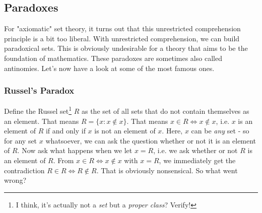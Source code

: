 
\subsection{Paradoxes}
For "axiomatic" set theory, it turns out that this unrestricted comprehension principle is a bit too liberal. With unrestricted comprehension, we can build paradoxical sets. This is obviously undesirable for a theory that aims to be the foundation of mathematics. These paradoxes are sometimes also called antinomies. Let's now have a look at some of the most famous ones.

\subsubsection{Russel's Paradox}
Define the Russel set\footnote{I think, it's actually not a \emph{set} but a \emph{proper class}? Verify!} $R$ as the set of all sets that do not contain themselves as an element. That means $R = \{x: x \notin x\}$. That means $x \in R \Leftrightarrow x \notin x$, i.e. $x$ is an element of $R$ if and only if $x$ is not an element of $x$. Here, $x$ can be \emph{any} set - so for any set $x$ whatsoever, we can ask the question whether or not it is an element of $R$. Now ask what happens when we let $x = R$, i.e. we ask whether or not $R$ is an element of $R$. From $x \in R \Leftrightarrow x \notin x$ with $x = R$, we immediately get the contradiction $R \in R \Leftrightarrow R \notin R$. That is obviously nonsensical. So what went wrong?


